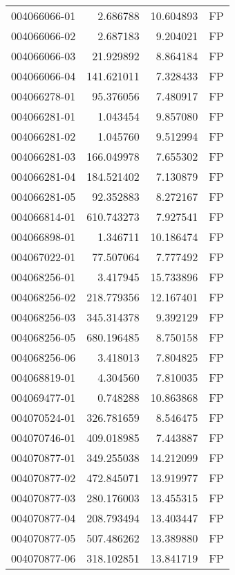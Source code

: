 \begin{tabular}{lrrl}
004066066-01 &    2.686788 &      10.604893 &   FP \\
004066066-02 &    2.687183 &       9.204021 &   FP \\
004066066-03 &   21.929892 &       8.864184 &   FP \\
004066066-04 &  141.621011 &       7.328433 &   FP \\
004066278-01 &   95.376056 &       7.480917 &   FP \\
004066281-01 &    1.043454 &       9.857080 &   FP \\
004066281-02 &    1.045760 &       9.512994 &   FP \\
004066281-03 &  166.049978 &       7.655302 &   FP \\
004066281-04 &  184.521402 &       7.130879 &   FP \\
004066281-05 &   92.352883 &       8.272167 &   FP \\
004066814-01 &  610.743273 &       7.927541 &   FP \\
004066898-01 &    1.346711 &      10.186474 &   FP \\
004067022-01 &   77.507064 &       7.777492 &   FP \\
004068256-01 &    3.417945 &      15.733896 &   FP \\
004068256-02 &  218.779356 &      12.167401 &   FP \\
004068256-03 &  345.314378 &       9.392129 &   FP \\
004068256-05 &  680.196485 &       8.750158 &   FP \\
004068256-06 &    3.418013 &       7.804825 &   FP \\
004068819-01 &    4.304560 &       7.810035 &   FP \\
004069477-01 &    0.748288 &      10.863868 &   FP \\
004070524-01 &  326.781659 &       8.546475 &   FP \\
004070746-01 &  409.018985 &       7.443887 &   FP \\
004070877-01 &  349.255038 &      14.212099 &   FP \\
004070877-02 &  472.845071 &      13.919977 &   FP \\
004070877-03 &  280.176003 &      13.455315 &   FP \\
004070877-04 &  208.793494 &      13.403447 &   FP \\
004070877-05 &  507.486262 &      13.389880 &   FP \\
004070877-06 &  318.102851 &      13.841719 &   FP \\

\end{tabular}
